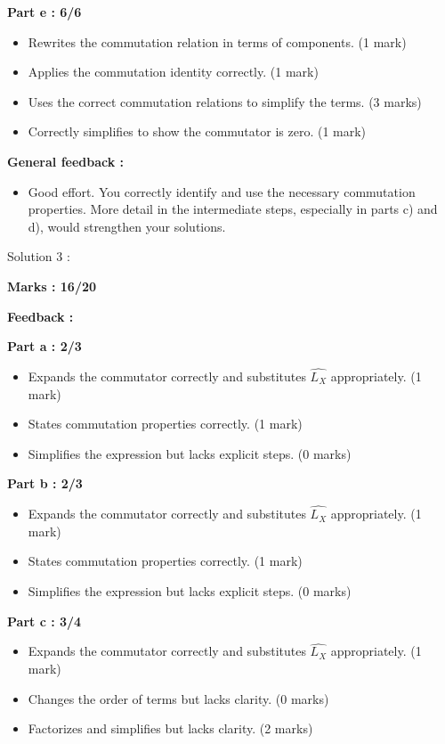 \documentclass[a4paper,11pt]{article}
\begin{document}
\textbf{Part e : 6/6}

\begin{itemize}
    \item Rewrites the commutation relation in terms of components. (1 mark)
    \item Applies the commutation identity correctly. (1 mark)
    \item Uses the correct commutation relations to simplify the terms. (3 marks)
    \item Correctly simplifies to show the commutator is zero. (1 mark)
\end{itemize}


\textbf{General feedback :}

\begin{itemize}
    \item Good effort. You correctly identify and use the necessary commutation properties. More detail in the intermediate steps, especially in parts c) and d), would strengthen your solutions.
\end{itemize}



Solution 3 :

\textbf{Marks : 16/20}

\textbf{Feedback :}

\textbf{Part a : 2/3}

\begin{itemize}
    \item Expands the commutator correctly and substitutes $\hat{L_X}$ appropriately. (1 mark)
    \item States commutation properties correctly. (1 mark)
    \item Simplifies the expression but lacks explicit steps. (0 marks)
\end{itemize}


\textbf{Part b : 2/3}

\begin{itemize}
    \item Expands the commutator correctly and substitutes $\hat{L_X}$ appropriately. (1 mark)
    \item States commutation properties correctly. (1 mark)
    \item Simplifies the expression but lacks explicit steps. (0 marks)
\end{itemize}


\textbf{Part c : 3/4}

\begin{itemize}
    \item Expands the commutator correctly and substitutes $\hat{L_X}$ appropriately. (1 mark)
    \item Changes the order of terms but lacks clarity. (0 marks)
    \item Factorizes and simplifies but lacks clarity. (2 marks)
\end{itemize}
\end{document}
